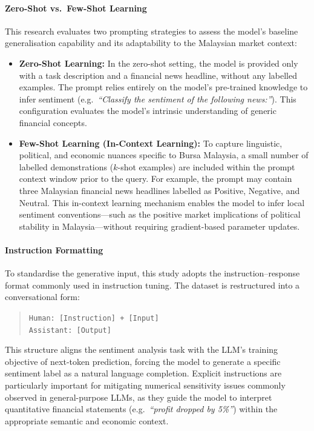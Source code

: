 \documentclass[singlespace]{ucetd}
\begin{document}
\paragraph{Zero-Shot vs.\ Few-Shot Learning}

This research evaluates two prompting strategies to assess the model’s baseline generalisation capability and its adaptability to the Malaysian market context:

\begin{itemize}
    \item \textbf{Zero-Shot Learning:}  
    In the zero-shot setting, the model is provided only with a task description and a financial news headline, without any labelled examples. The prompt relies entirely on the model’s pre-trained knowledge to infer sentiment (e.g.\ \emph{``Classify the sentiment of the following news:''}). This configuration evaluates the model’s intrinsic understanding of generic financial concepts.

    \item \textbf{Few-Shot Learning (In-Context Learning):}  
    To capture linguistic, political, and economic nuances specific to Bursa Malaysia, a small number of labelled demonstrations ($k$-shot examples) are included within the prompt context window prior to the query. For example, the prompt may contain three Malaysian financial news headlines labelled as Positive, Negative, and Neutral. This in-context learning mechanism enables the model to infer local sentiment conventions—such as the positive market implications of political stability in Malaysia—without requiring gradient-based parameter updates.
\end{itemize}

\paragraph{Instruction Formatting}

To standardise the generative input, this study adopts the instruction--response format commonly used in instruction tuning. The dataset is restructured into a conversational form:

\begin{quote}
\texttt{Human: [Instruction] + [Input]} \\
\texttt{Assistant: [Output]}
\end{quote}

This structure aligns the sentiment analysis task with the LLM’s training objective of next-token prediction, forcing the model to generate a specific sentiment label as a natural language completion. Explicit instructions are particularly important for mitigating numerical sensitivity issues commonly observed in general-purpose LLMs, as they guide the model to interpret quantitative financial statements (e.g.\ \emph{``profit dropped by 5\%''}) within the appropriate semantic and economic context.
\end{document}
